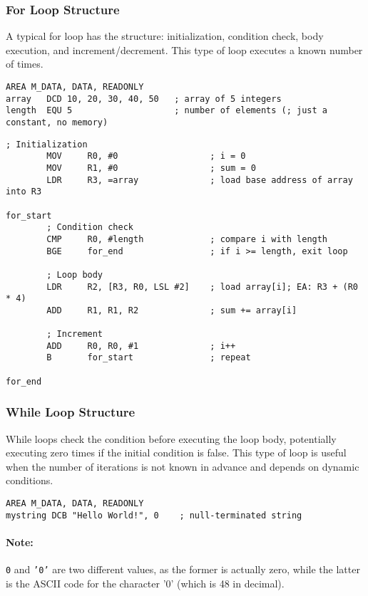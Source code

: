 \subsubsection{For Loop Structure}
A typical for loop has the structure: initialization, condition check, body execution, and increment/decrement. This type of loop executes a known number of times.
\begin{lstlisting}[caption={Declaring Array and Length}]
        AREA M_DATA, DATA, READONLY
array   DCD 10, 20, 30, 40, 50   ; array of 5 integers
length  EQU 5                    ; number of elements (; just a constant, no memory)
\end{lstlisting}
\begin{lstlisting}[caption={For loop implementation pattern}]
        ; Initialization
        MOV     R0, #0                  ; i = 0
        MOV     R1, #0                  ; sum = 0
        LDR     R3, =array              ; load base address of array into R3

for_start
        ; Condition check
        CMP     R0, #length             ; compare i with length
        BGE     for_end                 ; if i >= length, exit loop

        ; Loop body
        LDR     R2, [R3, R0, LSL #2]    ; load array[i]; EA: R3 + (R0 * 4)
        ADD     R1, R1, R2              ; sum += array[i]

        ; Increment
        ADD     R0, R0, #1              ; i++
        B       for_start               ; repeat

for_end
\end{lstlisting}
\subsubsection{While Loop Structure}
While loops check the condition before executing the loop body, potentially executing zero times if the initial condition is false. This type of loop is useful when the number of iterations is not known in advance and depends on dynamic conditions.
\begin{lstlisting}[caption={Declaring Null-Terminated String}]
        AREA M_DATA, DATA, READONLY
mystring DCB "Hello World!", 0    ; null-terminated string
\end{lstlisting}
\paragraph{Note:} \texttt{0} and \texttt{'0'} are two different values, as the former is actually zero, while the latter is the ASCII code for the character '0' (which is 48 in decimal).
\newpage

